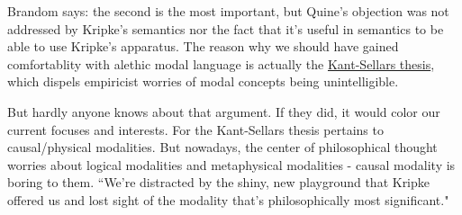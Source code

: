 Brandom says: the second is the most important, but Quine's objection was not addressed by Kripke's semantics nor the fact that it's useful in semantics to be able to use Kripke's apparatus. The reason why we should have gained comfortablity with alethic modal language is actually the \href{doc/phil/People/Brandom/On Sellars/Lectures 2009/Lecture: Counterfactuals and Kant Sellars Thesis/Kant Sellars thesis}{Kant-Sellars thesis}, which dispels empiricist worries of modal concepts being unintelligible.

But hardly anyone knows about that argument. If they did, it would color our current focuses and interests. For the Kant-Sellars thesis pertains to causal/physical modalities. But nowadays, the center of philosophical thought worries about logical modalities and metaphysical modalities - causal modality is boring to them. ``We're distracted by the shiny, new playground that Kripke offered us and lost sight of the modality that's philosophically most significant."